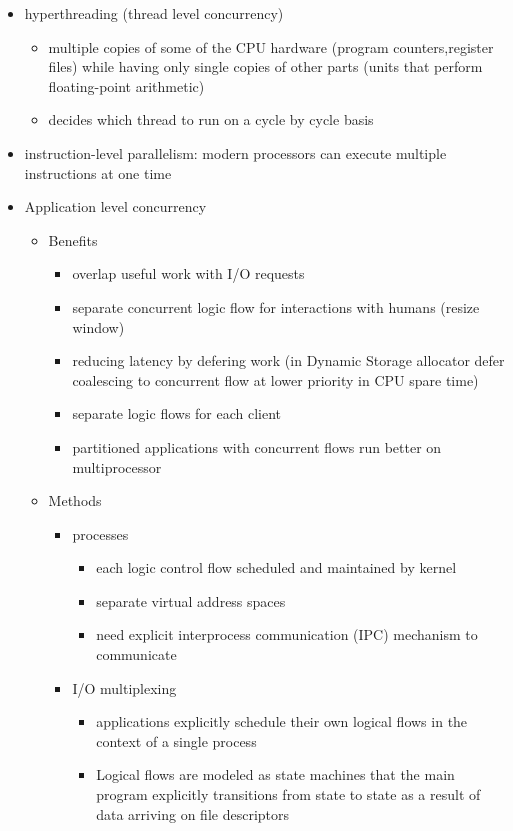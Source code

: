 \documentclass[11pt]{article}
\begin{document}
\begin{itemize}
  \item hyperthreading (thread level concurrency)
  \begin{itemize}
    \item multiple copies of some of the CPU hardware (program counters,register files) while having only single copies of other parts (units that perform floating-point arithmetic)
    \item decides which thread to run on a cycle by cycle basis
  \end{itemize}
  \item instruction-level parallelism: modern processors can execute multiple instructions at one time
  \item Application level concurrency
  \begin{itemize}
    \item Benefits
    \begin{itemize}
      \item overlap useful work with I/O requests
      \item separate concurrent logic flow for interactions with humans (resize window)
      \item reducing latency by defering work (in Dynamic Storage allocator defer coalescing to concurrent flow at lower priority in CPU spare time)
      \item separate logic flows for each client
      \item partitioned applications with concurrent flows run better on multiprocessor
    \end{itemize}
    \item Methods
    \begin{itemize}
      \item processes
      \begin{itemize}
        \item each logic control flow scheduled and maintained by kernel
        \item separate virtual address spaces
        \item need explicit interprocess communication (IPC) mechanism to communicate
      \end{itemize}
      \item I/O multiplexing
      \begin{itemize}
        \item applications explicitly schedule their own logical flows in the context of a single process
        \item Logical flows are modeled as state machines that the main program explicitly transitions from state to state as a result of data arriving on file descriptors

\end{itemize}
\end{itemize}
\end{itemize}
\end{itemize}
\end{document}
